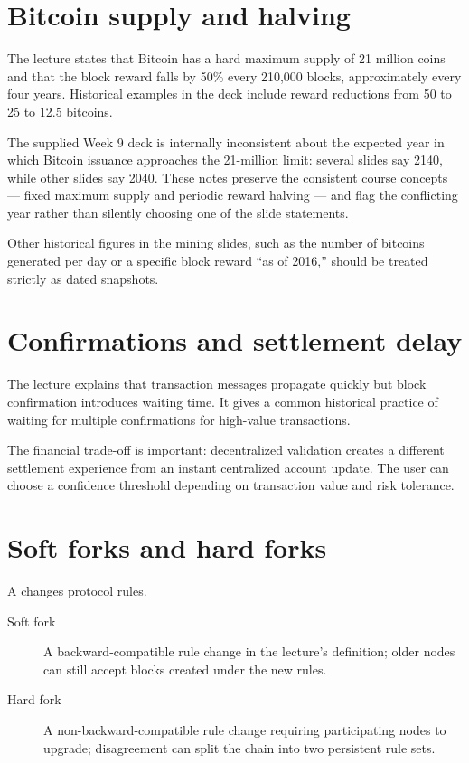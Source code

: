 \section{Bitcoin supply and halving}

The lecture states that Bitcoin has a hard maximum supply of 21 million coins and that the block reward falls by 50\% every 210,000 blocks, approximately every four years. Historical examples in the deck include reward reductions from 50 to 25 to 12.5 bitcoins.

\begin{libnote}
The supplied Week 9 deck is internally inconsistent about the expected year in which Bitcoin issuance approaches the 21-million limit: several slides say 2140, while other slides say 2040. These notes preserve the consistent course concepts --- fixed maximum supply and periodic reward halving --- and flag the conflicting year rather than silently choosing one of the slide statements.
\end{libnote}

Other historical figures in the mining slides, such as the number of bitcoins generated per day or a specific block reward ``as of 2016,'' should be treated strictly as dated snapshots.

\section{Confirmations and settlement delay}

The lecture explains that transaction messages propagate quickly but block confirmation introduces waiting time. It gives a common historical practice of waiting for multiple confirmations for high-value transactions.

The financial trade-off is important: decentralized validation creates a different settlement experience from an instant centralized account update. The user can choose a confidence threshold depending on transaction value and risk tolerance.

\section{Soft forks and hard forks}

A  changes protocol rules.

\begin{description}
  \item[Soft fork] A backward-compatible rule change in the lecture's definition; older nodes can still accept blocks created under the new rules.
  \item[Hard fork] A non-backward-compatible rule change requiring participating nodes to upgrade; disagreement can split the chain into two persistent rule sets.
\end{description}

